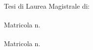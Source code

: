 \begin{titlepage}
\begin{center}
        \vfill  
        
        \flushright
        \normalsize{Tesi di Laurea Magistrale di:}\\
        \medskip \spacedlowsmallcaps{\myFirstAuthorName}\\
		Matricola n. \myMatrFirstAuthor \\ 
		\medskip\spacedlowsmallcaps{\mySecondAuthorName} \\
		Matricola n. \myMatrSecondAuthor \\
		
		\vfill 

		\centering {\myAcademicYearIT}                     

    \end{center}  
\end{titlepage}